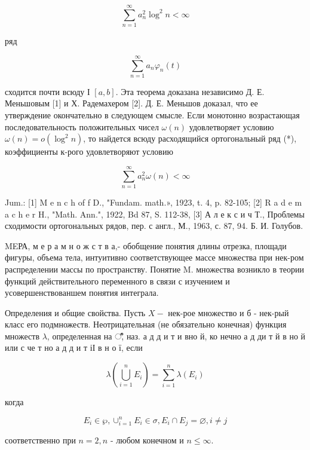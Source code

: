 \documentclass[10pt]{article}
\begin{document}
\[

\sum_{n=1}^{\infty} a_{n}^{2} \log ^{2} n<\infty

\]



ряд



\[

\sum_{n=1}^{\infty} a_{n} \varphi_{n}(t)

\]



сходится почти всюду І $[a, b]$. Эта теорема доказана независимо Д. Е. Меньшовым [1] и Х. Радемахером [2]. Д. Е. Меньшов доказал, что ее утверждение окончательно в следующем смысле. Если монотонно возрастающая последовательность положительных чисел $\omega(n)$ удовлетворяет условию $\omega(n)=o\left(\log ^{2} n\right)$, то найдется всюду расходящийся ортогональный ряд (*), коэффициенты к-рого удовлетворяют условию



\[

\sum_{n=1}^{\infty} a_{n}^{2} \omega(n)<\infty

\]



Jum.: [1] M e n c h of f D., "Fundam. math.», 1923, t. 4, p. 82-105; [2] R a d e m a c h e r H., "Math. Ann.", 1922, Bd 87, S. 112-38, [3] А л е к с и ч Т., Проблемы сходимости ортогональных рядов, пер. с англ., М., 1963, с. 87, 94. Б. И. Голубов.



MEРА, м е р а м н о ж с т в а,- обобщение понятия длины отрезка, площади фигуры, объема тела, интуитивно соответствующее массе множества при нек-ром распределении массы по пространству. Понятие M. множества возникло в теории функций действительного переменного в связи с изучением и усовершенствованшем понятия интеграла.



Определения и общие свойства. Пусть $X-$ нек-рое множество и б - нек-рый класс его подмножеств. Неотрицательная (не обязательно конечная) функция множеств $\lambda$, определенная на $ீ$, наз. а д д и т и вно й, ко нечно а д ди т й в но й или с че т но а д д и т іІ в н о ї, если



\[

\lambda\left(\bigcup_{i=1}^{n} E_{i}\right)=\sum_{i=1}^{n} \lambda\left(E_{i}\right)

\]



когда



\[

E_{i} \in \mathscr{\wp}, \cup_{i=1}^{n} E_{i} \in \mathscr{\sigma}, E_{i} \cap E_{j}=\varnothing, i \neq j

\]



соответственно при $n=2, n$ - любом конечном и $n \leqslant \infty$.
\end{document}
